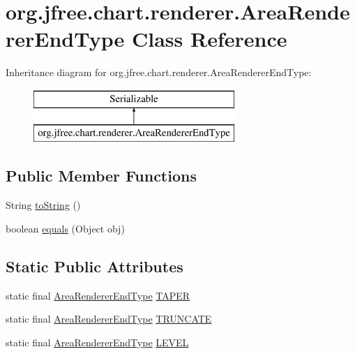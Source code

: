 \hypertarget{classorg_1_1jfree_1_1chart_1_1renderer_1_1_area_renderer_end_type}{}\section{org.\+jfree.\+chart.\+renderer.\+Area\+Renderer\+End\+Type Class Reference}
\label{classorg_1_1jfree_1_1chart_1_1renderer_1_1_area_renderer_end_type}
Inheritance diagram for org.\+jfree.\+chart.\+renderer.\+Area\+Renderer\+End\+Type\+:\begin{figure}[H]
\begin{center}
\leavevmode
\includegraphics[height=2.000000cm]{classorg_1_1jfree_1_1chart_1_1renderer_1_1_area_renderer_end_type}
\end{center}
\end{figure}
\subsection*{Public Member Functions}
\begin{DoxyCompactItemize}
\item 
String \mbox{\hyperlink{classorg_1_1jfree_1_1chart_1_1renderer_1_1_area_renderer_end_type_a1783571ad831b9fc88639027ab492c6c}{to\+String}} ()
\item 
boolean \mbox{\hyperlink{classorg_1_1jfree_1_1chart_1_1renderer_1_1_area_renderer_end_type_a311d3c60b924b0e76871b37fe06e6589}{equals}} (Object obj)
\end{DoxyCompactItemize}
\subsection*{Static Public Attributes}
\begin{DoxyCompactItemize}
\item 
static final \mbox{\hyperlink{classorg_1_1jfree_1_1chart_1_1renderer_1_1_area_renderer_end_type}{Area\+Renderer\+End\+Type}} \mbox{\hyperlink{classorg_1_1jfree_1_1chart_1_1renderer_1_1_area_renderer_end_type_afb3c302717f61bb7ac019ac445d76692}{T\+A\+P\+ER}}
\item 
static final \mbox{\hyperlink{classorg_1_1jfree_1_1chart_1_1renderer_1_1_area_renderer_end_type}{Area\+Renderer\+End\+Type}} \mbox{\hyperlink{classorg_1_1jfree_1_1chart_1_1renderer_1_1_area_renderer_end_type_a671cf856a58d0bf1734191fde4c8fffb}{T\+R\+U\+N\+C\+A\+TE}}
\item 
static final \mbox{\hyperlink{classorg_1_1jfree_1_1chart_1_1renderer_1_1_area_renderer_end_type}{Area\+Renderer\+End\+Type}} \mbox{\hyperlink{classorg_1_1jfree_1_1chart_1_1renderer_1_1_area_renderer_end_type_a926d5bf6f0f1308db1e84691f3dd869b}{L\+E\+V\+EL}}
\end{DoxyCompactItemize}


